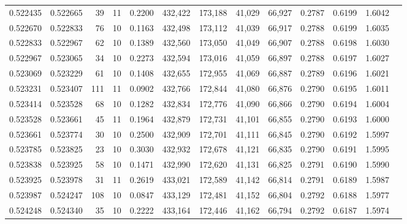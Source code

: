 \begin{tabular}{rrrrrrrrrrrrr}
0.522435 & 0.522665 &    39 &  11 &                                     0.2200 & 432,422 & 173,188 &  41,029 &  66,927 & 0.2787 & 0.6199 & 1.6042 \\
0.522670 & 0.522833 &    76 &  10 &                                     0.1163 & 432,498 & 173,112 &  41,039 &  66,917 & 0.2788 & 0.6199 & 1.6035 \\
0.522833 & 0.522967 &    62 &  10 &                                     0.1389 & 432,560 & 173,050 &  41,049 &  66,907 & 0.2788 & 0.6198 & 1.6030 \\
0.522967 & 0.523065 &    34 &  10 &                                     0.2273 & 432,594 & 173,016 &  41,059 &  66,897 & 0.2788 & 0.6197 & 1.6027 \\
0.523069 & 0.523229 &    61 &  10 &                                     0.1408 & 432,655 & 172,955 &  41,069 &  66,887 & 0.2789 & 0.6196 & 1.6021 \\
0.523231 & 0.523407 &   111 &  11 &                                     0.0902 & 432,766 & 172,844 &  41,080 &  66,876 & 0.2790 & 0.6195 & 1.6011 \\
0.523414 & 0.523528 &    68 &  10 &                                     0.1282 & 432,834 & 172,776 &  41,090 &  66,866 & 0.2790 & 0.6194 & 1.6004 \\
0.523528 & 0.523661 &    45 &  11 &                                     0.1964 & 432,879 & 172,731 &  41,101 &  66,855 & 0.2790 & 0.6193 & 1.6000 \\
0.523661 & 0.523774 &    30 &  10 &                                     0.2500 & 432,909 & 172,701 &  41,111 &  66,845 & 0.2790 & 0.6192 & 1.5997 \\
0.523785 & 0.523825 &    23 &  10 &                                     0.3030 & 432,932 & 172,678 &  41,121 &  66,835 & 0.2790 & 0.6191 & 1.5995 \\
0.523838 & 0.523925 &    58 &  10 &                                     0.1471 & 432,990 & 172,620 &  41,131 &  66,825 & 0.2791 & 0.6190 & 1.5990 \\
0.523925 & 0.523978 &    31 &  11 &                                     0.2619 & 433,021 & 172,589 &  41,142 &  66,814 & 0.2791 & 0.6189 & 1.5987 \\
0.523987 & 0.524247 &   108 &  10 &                                     0.0847 & 433,129 & 172,481 &  41,152 &  66,804 & 0.2792 & 0.6188 & 1.5977 \\
0.524248 & 0.524340 &    35 &  10 &                                     0.2222 & 433,164 & 172,446 &  41,162 &  66,794 & 0.2792 & 0.6187 & 1.5974 \\

\end{tabular}
